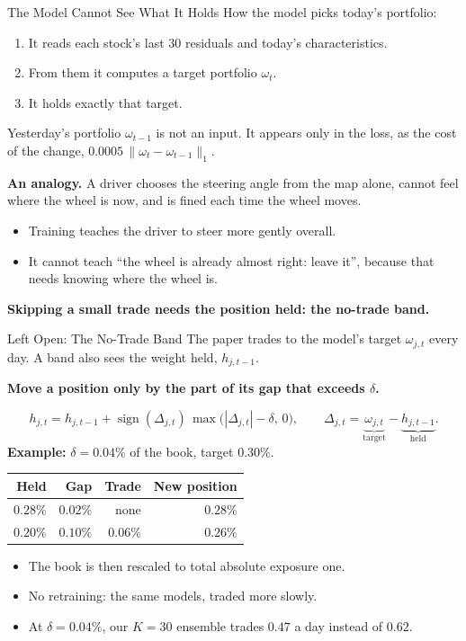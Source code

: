 \documentclass[11pt]{beamer}
\newcommand{\claim}[1]{%
  \par{\color{SBred}\bfseries #1\par}
}
\begin{document}
\begin{frame}{The Model Cannot See What It Holds}
\small
How the model picks today's portfolio:
\begin{enumerate}
\item It reads each stock's last 30 residuals and today's characteristics.
\item From them it computes a target portfolio $\omega_t$.
\item It holds exactly that target.
\end{enumerate}
Yesterday's portfolio $\omega_{t-1}$ is not an input. It appears only in the loss,
as the cost of the change, $0.0005\,\|\omega_t-\omega_{t-1}\|_1$.

\medskip
\textbf{An analogy.} A driver chooses the steering angle from the map alone,
cannot feel where the wheel is now, and is fined each time the wheel moves.
\begin{itemize}
\item Training teaches the driver to steer more gently overall.
\item It cannot teach ``the wheel is already almost right: leave it'',
      because that needs knowing where the wheel is.
\end{itemize}
\claim{Skipping a small trade needs the position held: the no-trade band.}
\end{frame}

\begin{frame}{Left Open: The No-Trade Band}
\small
The paper trades to the model's target $\omega_{j,t}$ every day. A band also sees the weight held, $h_{j,t-1}$.

\claim{Move a position only by the part of its gap that exceeds $\delta$.}
\[
h_{j,t}=h_{j,t-1}+\operatorname{sign}(\Delta_{j,t})\,\max\big(|\Delta_{j,t}|-\delta,\,0\big),
\qquad
\Delta_{j,t}=\underbrace{\omega_{j,t}}_{\text{target}}-\underbrace{h_{j,t-1}}_{\text{held}}.
\]
\textbf{Example:} $\delta=0.04\%$ of the book, target $0.30\%$.
\begin{center}
\begin{tabular}{@{}rrrr@{}}
\toprule
Held & Gap & Trade & New position\\
\midrule
$0.28\%$ & $0.02\%$ & none & $0.28\%$\\
$0.20\%$ & $0.10\%$ & $0.06\%$ & $0.26\%$\\
\bottomrule
\end{tabular}
\end{center}
\begin{itemize}
\item The book is then rescaled to total absolute exposure one.
\item No retraining: the same models, traded more slowly.
\item At $\delta=0.04\%$, our $K=30$ ensemble trades $0.47$ a day instead of $0.62$.
\end{itemize}
\end{frame}
\end{document}
